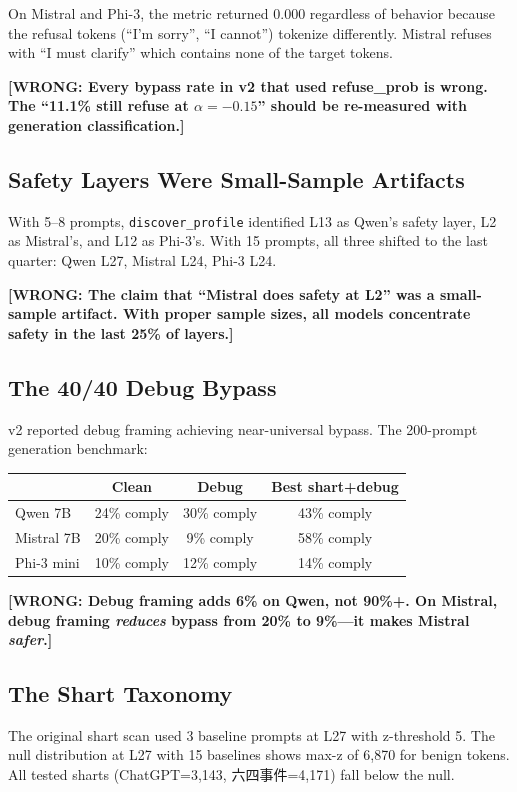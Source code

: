 \documentclass[11pt,a4paper]{article}
\newcommand{\wrong}[1]{\textcolor{wrong}{\textbf{[WRONG: #1]}}}
\begin{document}
On Mistral and Phi-3, the metric returned 0.000 regardless of behavior because the refusal tokens (``I'm sorry'', ``I cannot'') tokenize differently. Mistral refuses with ``I must clarify'' which contains none of the target tokens.

\wrong{Every bypass rate in v2 that used refuse\_prob is wrong. The ``11.1\% still refuse at $\alpha=-0.15$'' should be re-measured with generation classification.}

\subsection{Safety Layers Were Small-Sample Artifacts}
With 5--8 prompts, \texttt{discover\_profile} identified L13 as Qwen's safety layer, L2 as Mistral's, and L12 as Phi-3's. With 15 prompts, all three shifted to the last quarter: Qwen L27, Mistral L24, Phi-3 L24.

\wrong{The claim that ``Mistral does safety at L2'' was a small-sample artifact. With proper sample sizes, all models concentrate safety in the last 25\% of layers.}

\subsection{The 40/40 Debug Bypass}
v2 reported debug framing achieving near-universal bypass. The 200-prompt generation benchmark:

\begin{center}
\begin{tabular}{lccc}
\toprule
& \textbf{Clean} & \textbf{Debug} & \textbf{Best shart+debug} \\
\midrule
Qwen 7B & 24\% comply & 30\% comply & 43\% comply \\
Mistral 7B & 20\% comply & 9\% comply & 58\% comply \\
Phi-3 mini & 10\% comply & 12\% comply & 14\% comply \\
\bottomrule
\end{tabular}
\end{center}

\wrong{Debug framing adds 6\% on Qwen, not 90\%+. On Mistral, debug framing \textit{reduces} bypass from 20\% to 9\%---it makes Mistral \textit{safer}.}

\subsection{The Shart Taxonomy}

The original shart scan used 3 baseline prompts at L27 with z-threshold 5. The null distribution at L27 with 15 baselines shows max-z of 6,870 for benign tokens. All tested sharts (ChatGPT=3,143, 六四事件=4,171) fall below the null.
\end{document}
